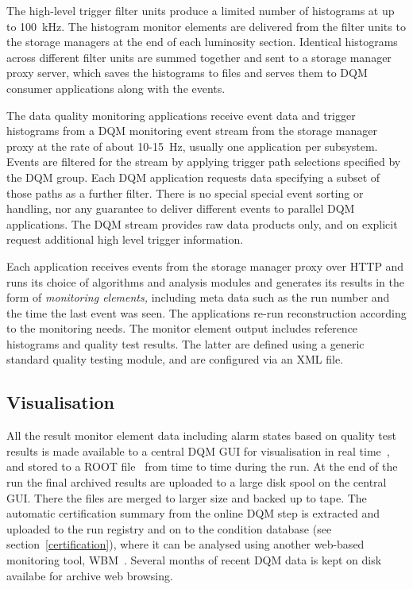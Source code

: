\documentclass[a4paper]{jpconf}
\begin{document}
The high-level trigger filter units produce a limited number of histograms at
up to 100~kHz.  The histogram monitor elements are delivered from the filter
units to the storage managers at the end of each luminosity section.
Identical histograms across different filter units are summed together and
sent to a storage manager proxy server, which saves the histograms to files
and serves them to DQM consumer applications along with the events.

The data quality monitoring applications receive event data and trigger
histograms from a DQM monitoring event stream from the storage manager proxy
at the rate of about 10-15~Hz, usually one application per subsystem.  Events
are filtered for the stream by applying trigger path selections specified by
the DQM group.  Each DQM application requests data specifying a subset of
those paths as a further filter.  There is no special special event sorting or
handling, nor any guarantee to deliver different events to parallel DQM
applications.  The DQM stream provides raw data products only, and on explicit
request additional high level trigger information.

Each application receives events from the storage manager proxy over HTTP and
runs its choice of algorithms and analysis modules and generates its results
in the form of {\em monitoring elements,} including meta data such as the run
number and the time the last event was seen.  The applications re-run
reconstruction according to the monitoring needs.  The monitor element output
includes reference histograms and quality test results.  The latter are defined
using a generic standard quality testing module, and are configured via an XML
file.

\subsection{Visualisation}

All the result monitor element data including alarm states based on quality
test results is made available to a central DQM GUI for visualisation in real
time~\cite{dqm_gui_09}, and stored to a ROOT file~\cite{root} from time to
time during the run.  At the end of the run the final archived results are
uploaded to a large disk spool on the central GUI.  There the files are merged
to larger size and backed up to tape.  The automatic certification summary
from the online DQM step is extracted and uploaded to the run registry and on
to the condition database (see section~\ref{certification}), where it can be
analysed using another web-based monitoring tool, WBM~\cite{wbm}.  Several
months of recent DQM data is kept on disk availabe for archive web browsing.
\end{document}
